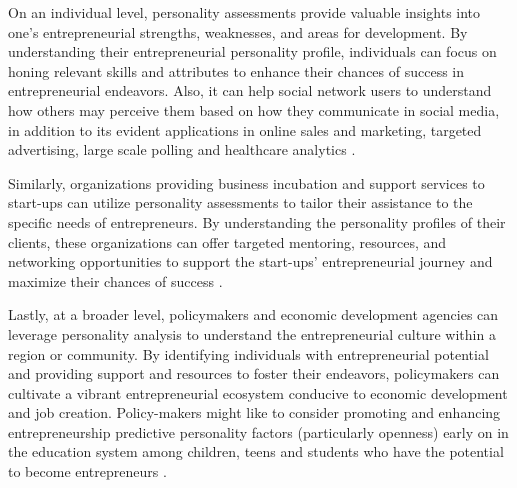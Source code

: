 On an individual level, personality assessments provide valuable insights into one's entrepreneurial strengths, weaknesses, and areas for development. By understanding their entrepreneurial personality profile, individuals can focus on honing relevant skills and attributes to enhance their chances of success in entrepreneurial endeavors. Also, it can help social network users to understand how others may perceive them based on how they communicate in social media, in addition to its evident applications in online sales and marketing, targeted advertising, large scale polling and healthcare analytics \cite{volkova2015inferring}.

Similarly, organizations providing business incubation and support services to start-ups can utilize personality assessments to tailor their assistance to the specific needs of entrepreneurs. By understanding the personality profiles of their clients, these organizations can offer targeted mentoring, resources, and networking opportunities to support the start-ups' entrepreneurial journey and maximize their chances of success \cite{antoncic2015big}.

Lastly, at a broader level, policymakers and economic development agencies can leverage personality analysis to understand the entrepreneurial culture within a region or community. By identifying individuals with entrepreneurial potential and providing support and resources to foster their endeavors, policymakers can cultivate a vibrant entrepreneurial ecosystem conducive to economic development and job creation. Policy-makers might like to consider promoting and enhancing entrepreneurship predictive personality factors (particularly openness) early on in the education system among children, teens and students who have the potential to become entrepreneurs \cite{antoncic2015big}.

%
%

%